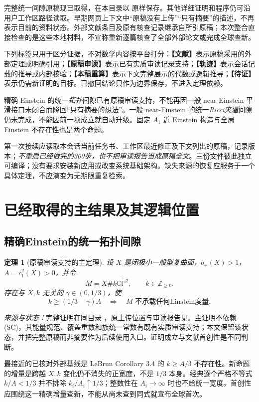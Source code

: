 \documentclass[UTF8,a4paper,11pt,fontset=fandol]{ctexart}
\numberwithin{equation}{section}
\newtheorem{theorem}{定理}[section]
\theoremstyle{definition}
\newcommand{\CP}{\mathbb{CP}}
\newcommand{\Z}{\mathbb Z}
\newcommand{\source}[1]{\par\noindent\textit{来源与状态：}#1\par}
\newcommand{\status}[1]{\textbf{【#1】}}
\begin{document}
完整统一间隙原稿现已取得，在本目录以  原样保存。其他详细证明和程序仍可沿用户工作区路径读取。早期网页上下文中“原稿没有上传”“只有摘要”的描述，不再表示目前的资料状态。外部文献条目及原有核查记录继承自所引原稿；本次整合直接检查的是这些本地材料，不宣称重新逐篇核查了全部外部论文或完成全球查新。

下列标签只用于区分证据，不对数学内容按平台打分：\status{文献}表示原稿采用的外部定理或明确引用；\status{原稿审读}表示已有实质审读记录支持；\status{轨迹}表示会话记载的推导或内部核验；\status{本稿重算}表示下文完整展示的代数或逻辑推导；\status{待证}表示仍需新证明的目标。已撤回结论只作为边界保存，不进入定理依赖。

精确 Einstein 的统一\emph{拓扑}间隙已有原稿审读支持，不能再因一般 near-Einstein 平滑接口未闭合而降回“只有摘要的想法”。一般 near-Einstein 的统一\emph{Ricci夹逼}间隙仍未完成，不能因前一项成立就自动升级。固定 $A_1$ 近 Einstein 构造与全局 Einstein 不存在性也是两个命题。

第一次接续应读取本会话当前任务书、工作区最近修正及下文列出的原稿，记录版本；\emph{不重启已经做完的300步，也不把审读报告当成原稿全文}。三份文件彼此独立可编译；没有要求安装新应用或改变系统基础架构。缺失来源的恢复应服务于一个具体定理，不应演变为无期限重复检索。

\section{已经取得的主结果及其逻辑位置}
\subsection{精确Einstein的统一拓扑间隙}
\begin{theorem}[原稿审读支持的主定理]\label{thm:topgap}
设 $X$ 是闭极小一般型复曲面，$b_+(X)>1$，$A=c_1^2(X)>0$，并令
\[
M=X\#k\overline{\CP^2},\qquad k\in\Z_{\ge0}.
\]
存在与 $X,k$ 无关的 $\gamma\in(0,1/3)$，使
\begin{equation}\label{eq:topgap}
 k\ge(1/3-\gamma)A\quad\Longrightarrow\quad
 M\text{ 不承载任何Einstein度量}.
\end{equation}
\end{theorem}
\source{完整证明在同目录 ，原上传位置与审读报告见\cite{Project,CodexReview}。主证明不依赖(SC)，其能量规范、覆盖重数和族统一常数有既有实质审读支持；本文保留该状态，并把完整原稿而非摘要作为后续使用入口。证明成立与文献首创性是不同判断。}

最接近的已核对外部基线是 LeBrun Corollary 3.4 的 $k\ge A/3$ 不存在性\cite{LeBrun2001}。新命题的增量是跨越 $X,k$ 变化仍不消失的正宽度，不是 $1/3$ 本身。经典逐个严格不等式 $k/A<1/3$ 并不排除 $k_i/A_i\uparrow1/3$；整数性在 $A_i\to\infty$ 时也不给统一宽度。首创性应围绕这一精确增量查新，不能从尚未查到同式就宣布全球首次。
\end{document}
